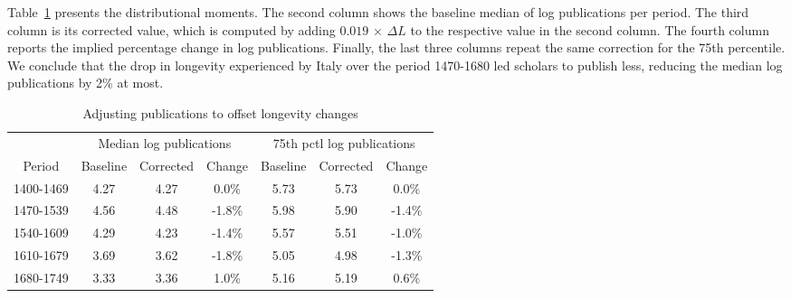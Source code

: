 Table~\ref{tab:adjust2} presents the distributional moments. The second column shows the baseline median of log publications per period. The third column is its corrected value, which is computed by adding $0.019$ $\times$ $\Delta L$ to the respective value in the second column.
The fourth column reports the implied percentage change in log publications. Finally, the last three columns repeat the same correction for the 75th percentile.
We conclude that the drop in longevity experienced by Italy over the period 1470-1680 led scholars to publish less, reducing the median log publications by 2\% at most.

\begin{table}[ht]
\centering
\begin{tabular}{ccccccc}
\toprule
                   & \multicolumn{3}{c}{Median log publications} & \multicolumn{3}{c}{75th pctl log publications} \\
               Period     & \multicolumn{1}{l}{Baseline} & \multicolumn{1}{l}{Corrected} & \multicolumn{1}{l}{Change} & \multicolumn{1}{l}{Baseline} & \multicolumn{1}{l}{Corrected} & \multicolumn{1}{l}{Change} \\
         \midrule
1400-1469     & 4.27     & 4.27     & 0.0\%    & 5.73     & 5.73     & 0.0\% \\
1470-1539     & 4.56     & 4.48     & -1.8\%   & 5.98     & 5.90     & -1.4\% \\
1540-1609     & 4.29     & 4.23     & -1.4\%   & 5.57     & 5.51     & -1.0\% \\
1610-1679     & 3.69     & 3.62     & -1.8\%   & 5.05     & 4.98     & -1.3\% \\
1680-1749     & 3.33     & 3.36     & 1.0\%    & 5.16     & 5.19     & 0.6\% \\
\bottomrule
\end{tabular}
\caption{Adjusting publications to offset longevity changes}\label{tab:adjust2}
\end{table}

